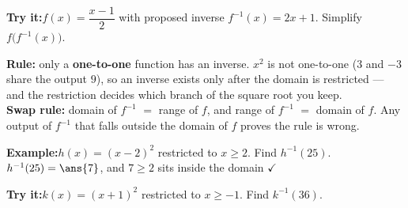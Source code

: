 \documentclass[12pt]{article}
\begin{document}
\begin{tryitbox}
\textbf{Try it:}\quad $f(x) = \dfrac{x - 1}{2}$ with proposed inverse
$f^{-1}(x) = 2x + 1$. Simplify $f\bigl(f^{-1}(x)\bigr)$.\\[2pt]
\end{tryitbox}


\begin{formulabox}
\textbf{Rule:} only a \textbf{one-to-one} function has an inverse. $x^2$ is not
one-to-one ($3$ and $-3$ share the output $9$), so an inverse exists only after
the domain is restricted --- and the restriction decides which branch of the
square root you keep.\\[3pt]
\textbf{Swap rule:} domain of $f^{-1}$ $=$ range of $f$, and range of $f^{-1}$
$=$ domain of $f$. Any output of $f^{-1}$ that falls outside the domain of $f$
proves the rule is wrong.
\end{formulabox}

\begin{examplebox}
\textbf{Example:}\quad $h(x) = (x - 2)^2$ restricted to $x \ge 2$. Find $h^{-1}(25)$.
$h^{-1}(25) = \ans{7}$, and $7 \ge 2$ sits inside the domain $\checkmark$
\end{examplebox}

\begin{tryitbox}
\textbf{Try it:}\quad $k(x) = (x + 1)^2$ restricted to $x \ge -1$. Find
$k^{-1}(36)$.\\[2pt]
\end{tryitbox}
\end{document}
